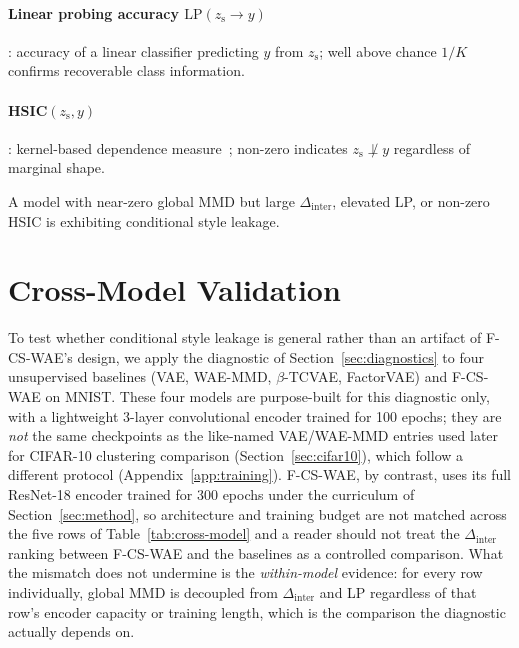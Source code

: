 \documentclass[10pt,letterpaper]{article}
\newcommand{\ours}{F-CS-WAE}
\newcommand{\zs}{z_{\mathrm{s}}}
\begin{document}
\paragraph{Linear probing accuracy $\mathrm{LP}(\zs\to y)$}: accuracy of a
linear classifier predicting $y$ from $\zs$; well above chance $1/K$
confirms recoverable class information.

\paragraph{HSIC$(\zs,y)$}: kernel-based dependence
measure~\citep{gretton2005measuring}; non-zero indicates $\zs\not\perp y$
regardless of marginal shape.

A model with near-zero global MMD but large $\Delta_{\mathrm{inter}}$,
elevated LP, or non-zero HSIC is exhibiting conditional style leakage.

\section{Cross-Model Validation}
\label{sec:cross-model}

To test whether conditional style leakage is general rather than an artifact
of \ours{}'s design, we apply the diagnostic of
Section~\ref{sec:diagnostics} to four unsupervised baselines (VAE, WAE-MMD,
$\beta$-TCVAE, FactorVAE) and \ours{} on MNIST. These four models are
purpose-built for this diagnostic only, with a lightweight 3-layer
convolutional encoder trained for 100 epochs; they are \emph{not} the same
checkpoints as the like-named VAE/WAE-MMD entries used later for CIFAR-10
clustering comparison (Section~\ref{sec:cifar10}), which follow a different
protocol (Appendix~\ref{app:training}). \ours{}, by contrast, uses its full
ResNet-18 encoder trained for 300 epochs under the curriculum of
Section~\ref{sec:method}, so architecture and training budget are not
matched across the five rows of Table~\ref{tab:cross-model} and a reader
should not treat the $\Delta_{\mathrm{inter}}$ ranking between \ours{} and
the baselines as a controlled comparison. What the mismatch does not
undermine is the \emph{within-model} evidence: for every row individually,
global MMD is decoupled from $\Delta_{\mathrm{inter}}$ and LP regardless of
that row's encoder capacity or training length, which is the comparison the
diagnostic actually depends on.
\end{document}
